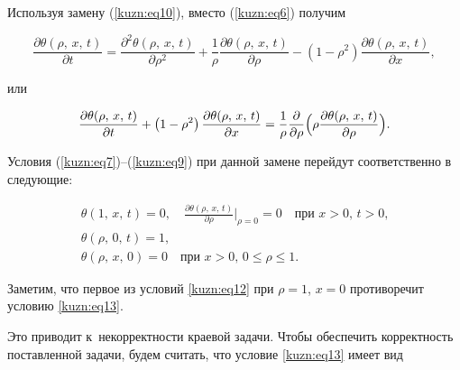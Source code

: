 Используя замену (\ref{kuzn:eq10}), вместо (\ref{kuzn:eq6}) получим 

\[

\frac{\partial \theta (\rho,\,x,\,t)}{\partial t}=\frac{\partial

^2 \theta (\rho,\,x,\,t)}{\partial \rho^2}+\frac{1}{\rho }\frac{\partial

\theta (\rho,\,x,\,t)}{\partial \rho }-\left( 1-\rho^2\right)\frac{\partial

\theta (\rho,\,x,\,t)}{\partial x},

\]

или

\begin{equation}

\label{kuzn:eq11}

 \frac{\partial \theta (\rho,\,x,\,t)}{\partial t}+

 \left( 1-\rho ^2\right)\frac{\partial \theta (\rho ,\,x,\,t)}{\partial x}=

 \frac{1}{\rho }\frac{\partial }{\partial \rho }\Bigl( \rho \frac{\partial \theta (\rho,\,x,\,t)}{\partial \rho} \Bigr).

\end{equation}

Условия (\ref{kuzn:eq7})--(\ref{kuzn:eq9}) при данной замене перейдут соответственно в следующие:

\begin{gather}

\label{kuzn:eq12}

\theta (1,\,x,\,t) = 0,\quad  \frac{\partial \theta (\rho,\,x,\,t)}{\partial \rho }\Bigr|_{\rho =0}

 =0 \quad \text{при $x > 0$, $t  > 0$,}\\

\label{kuzn:eq13}

\theta( \rho ,\, 0,\, t)= 1,\\

\label{kuzn:eq14}

\theta (\rho ,\, x,\, 0) = 0 \quad \text{при $x >0$, $0 \le \rho \le 1$}.

\end{gather}



Заметим, что первое из условий \eqref{kuzn:eq12} при $\rho  = 1$, $x = 0$ противоречит условию \eqref{kuzn:eq13}.

Это приводит к~некорректности краевой задачи. Чтобы обеспечить корректность поставленной задачи, будем считать, что условие \eqref{kuzn:eq13} имеет вид

